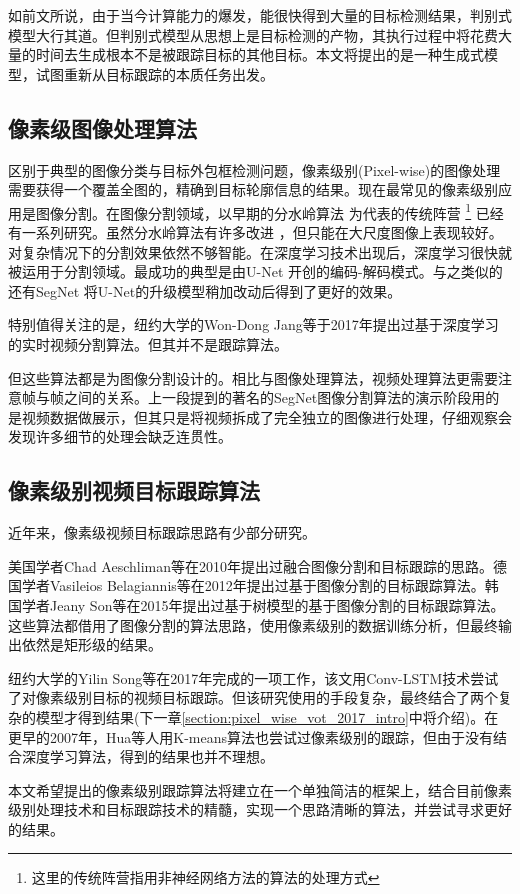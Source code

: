 \par
如前文所说，由于当今计算能力的爆发，能很快得到大量的目标检测结果，判别式模型大行其道。但判别式模型从思想上是目标检测的产物，其执行过程中将花费大量的时间去生成根本不是被跟踪目标的其他目标。本文将提出的是一种生成式模型，试图重新从目标跟踪的本质任务出发。

\subsection{像素级图像处理算法}
区别于典型的图像分类与目标外包框检测问题，像素级别(Pixel-wise)的图像处理需要获得一个覆盖全图的，精确到目标轮廓信息的结果。现在最常见的像素级别应用是图像分割。在图像分割领域，以早期的分水岭算法
\supercite{olsen1997multi}
为代表的传统阵营
\footnote{这里的传统阵营指用非神经网络方法的算法的处理方式}
已经有一系列研究。虽然分水岭算法有许多改进
\supercite{grau2004improved}
，但只能在大尺度图像上表现较好。对复杂情况下的分割效果依然不够智能。在深度学习技术出现后，深度学习很快就被运用于分割领域。最成功的典型是由U-Net
\supercite{ronneberger2015u}
开创的编码-解码模式。与之类似的还有SegNet
\supercite{badrinarayanan2017segnet}
将U-Net的升级模型稍加改动后得到了更好的效果。
\par
特别值得关注的是，纽约大学的Won-Dong Jang等于2017年提出过基于深度学习的实时视频分割算法\supercite{jang2017online}。但其并不是跟踪算法。
\par
但这些算法都是为图像分割设计的。相比与图像处理算法，视频处理算法更需要注意帧与帧之间的关系。上一段提到的著名的SegNet图像分割算法的演示阶段用的是视频数据做展示，但其只是将视频拆成了完全独立的图像进行处理，仔细观察会发现许多细节的处理会缺乏连贯性。

\subsection{像素级别视频目标跟踪算法}
近年来，像素级视频目标跟踪思路有少部分研究。
\par
美国学者Chad Aeschliman等在2010年提出过融合图像分割和目标跟踪的思路\supercite{aeschliman2010probabilistic}。德国学者Vasileios Belagiannis等在2012年提出过基于图像分割的目标跟踪算法\supercite{belagiannis2012segmentation}。韩国学者Jeany Son等在2015年提出过基于树模型的基于图像分割的目标跟踪算法\supercite{son2015tracking}。这些算法都借用了图像分割的算法思路，使用像素级别的数据训练分析，但最终输出依然是矩形级的结果。
\par
纽约大学的Yilin Song等在2017年完成的一项工作\supercite{DBLP:journals/corr/abs-1711-07377}，该文用Conv-LSTM技术\supercite{PatrauceanHC16}尝试了对像素级别目标的视频目标跟踪。但该研究使用的手段复杂，最终结合了两个复杂的模型才得到结果(下一章\ref{section:pixel_wise_vot_2017_intro}中将介绍)。在更早的2007年，Hua等人用K-means算法也尝试过像素级别的跟踪\supercite{hua2008k}，但由于没有结合深度学习算法，得到的结果也并不理想。
\par
本文希望提出的像素级别跟踪算法将建立在一个单独简洁的框架上，结合目前像素级别处理技术和目标跟踪技术的精髓，实现一个思路清晰的算法，并尝试寻求更好的结果。

